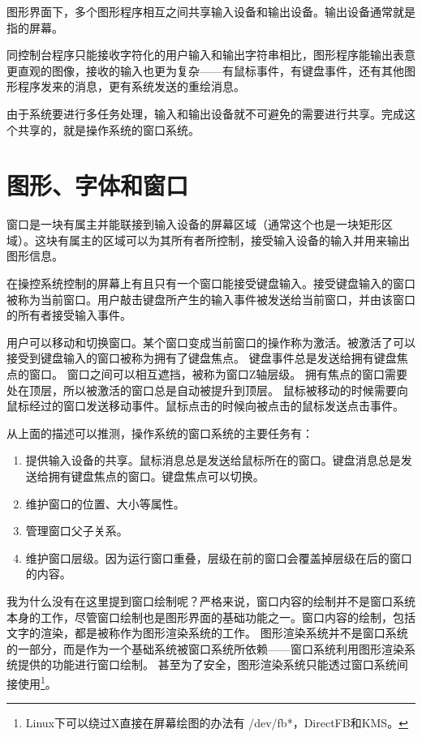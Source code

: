 \documentclass[amstex,twoside]{ctexbook}
\begin{document}
图形界面下，多个图形程序相互之间共享输入设备和输出设备。输出设备通常就是指的屏幕。

同控制台程序只能接收字符化的用户输入和输出字符串相比，图形程序能输出表意更直观的图像，接收的输入也更为复杂——有鼠标事件，有键盘事件，还有其他图形程序发来的消息，更有系统发送的重绘消息。

由于系统要进行多任务处理，输入和输出设备就不可避免的需要进行共享。完成这个共享的，就是操作系统的窗口系统。

\section{图形、字体和窗口}

窗口是一块有属主并能联接到输入设备的屏幕区域（通常这个也是一块矩形区域）。这块有属主的区域可以为其所有者所控制，接受输入设备的输入并用来输出图形信息。

在操控系统控制的屏幕上有且只有一个窗口能接受键盘输入。接受键盘输入的窗口被称为当前窗口。用户敲击键盘所产生的输入事件被发送给当前窗口，并由该窗口的所有者接受输入事件。

用户可以移动和切换窗口。某个窗口变成当前窗口的操作称为激活。被激活了可以接受到键盘输入的窗口被称为拥有了键盘焦点。
键盘事件总是发送给拥有键盘焦点的窗口。
窗口之间可以相互遮挡，被称为窗口Z轴层级。
拥有焦点的窗口需要处在顶层，所以被激活的窗口总是自动被提升到顶层。
鼠标被移动的时候需要向鼠标经过的窗口发送移动事件。鼠标点击的时候向被点击的鼠标发送点击事件。

从上面的描述可以推测，操作系统的窗口系统的主要任务有：

\begin{enumerate}

\item	提供输入设备的共享。鼠标消息总是发送给鼠标所在的窗口。键盘消息总是发送给拥有键盘焦点的窗口。键盘焦点可以切换。

\item	维护窗口的位置、大小等属性。

\item	管理窗口父子关系。

\item	维护窗口层级。因为运行窗口重叠，层级在前的窗口会覆盖掉层级在后的窗口的内容。

\end{enumerate}

我为什么没有在这里提到窗口绘制呢？严格来说，窗口内容的绘制并不是窗口系统本身的工作，尽管窗口绘制也是图形界面的基础功能之一。窗口内容的绘制，包括文字的渲染，都是被称作为图形渲染系统的工作。
图形渲染系统并不是窗口系统的一部分，而是作为一个基础系统被窗口系统所依赖——窗口系统利用图形渲染系统提供的功能进行窗口绘制。
甚至为了安全，图形渲染系统只能透过窗口系统间接使用\footnote{Linux下可以绕过X直接在屏幕绘图的办法有
/dev/fb*，DirectFB和KMS。}。
\end{document}
